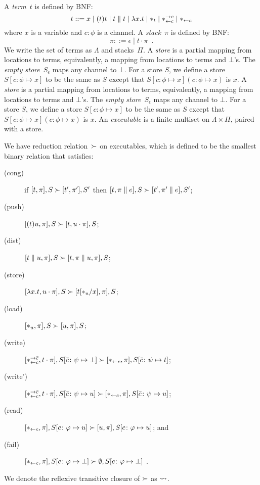 A \textit{term}~$t$ is defined by BNF:
\[
 t::= x
 \mid (t)t
 \mid t\parallel t
 \mid \lambda x.t
 \mid \ast_t
 \mid \ast^{\rightarrow {c}}_{\leftarrow{c}}
 \mid \ast_{\leftarrow{c}}
\]
where $x$ is a variable and $c\colon\phi$ is a channel.
A \textit{stack}~$\pi$ is defined by BNF:
\[
 \pi ::= \epsilon
 \mid t\cdot \pi
 \enspace.
\]
We write the set of terms as $\Lambda$ and stacks~$\Pi$.
A \textit{store} is a partial mapping from locations to
terms, equivalently, a mapping from locations to terms and $\bot$'s.
The \textit{empty store}~$S_\epsilon$ maps any channel to $\bot$.
For a store $S$, we define a store $S[c\colon\phi\mapsto x]$ to be
the same as $S$ except that $S[c\colon\phi\mapsto x](c\colon\phi\mapsto
x)$ is $x$.
A \textit{store} is a partial mapping from locations to
terms, equivalently, a mapping from locations to terms and $\bot$'s.
The \textit{empty store}~$S_\epsilon$ maps any channel to $\bot$.
For a store $S$, we define a store $S[c\colon\phi\mapsto x]$ to be
the same as $S$ except that $S[c\colon\phi\mapsto x](c\colon\phi\mapsto
x)$ is $x$.
An \textit{executable} is a finite multiset on $\Lambda \times \Pi$,
paired with a store.

We have reduction relation~$\succ$ on executables,
which is defined to be the smallest binary relation
that satisfies:
\begin{description}
 \item[(cong)] if
	    $[t,\pi],         S \succ [ t',\pi'],        S'$
	    then
	    $[t,\pi \parallel e], S \succ [ t',\pi'\parallel e], S'$\enspace;
 \item[(push)]
	    $[(t)u,\pi],S       \succ [t,u\cdot\pi],S$;
 \item[(dist)]
	    $[t\parallel u,\pi],S   \succ [t,\pi\parallel u,\pi],S$\enspace;
 \item[(store)]
	    $[\lambda x.t,u\cdot\pi],S
	     \succ
	     [t[\ast_u/x],      \pi],S$\enspace;
 \item[(load)]
	    $[\ast_u,\pi],S\succ[u,\pi],S$\enspace;
 \item[(write)]
	    $
	    [\ast^{\rightarrow {\bar{c}}}_{\leftarrow{c}}, t\cdot\pi], S[\bar{c}\colon\psi\mapsto\bot]
	    \succ
	    [\ast_{\leftarrow{c}}, \pi],
	    S[\bar{c}\colon\psi\mapsto t]
	    $\enspace;
 \item[(write')]
	    $
	    [\ast^{\rightarrow {\bar{c}}}_{\leftarrow{c}}, t\cdot\pi], S[\bar{c}\colon\psi\mapsto u]
	    \succ
	    [\ast_{\leftarrow{c}}, \pi],
	    S[\bar{c}\colon\psi\mapsto u]
	    $\enspace;
 \item[(read)]$
	    [\ast_{\leftarrow{c}} ,\pi],
	    S[c\colon\varphi\mapsto u]
	    \succ
	    [u,\pi],
	    S[c\colon\varphi\mapsto u]
	    $\enspace; and
 \item[(fail)]
	    $
	    [\ast_{\leftarrow{c}},\pi],
	    S[c\colon\varphi\mapsto \bot]
	    \succ
	    \emptyset,S[c\colon\varphi\mapsto \bot]
	    $
	    \enspace.
\end{description}
We denote the reflexive transitive closure of $\succ$ as $\rightsquigarrow$.


